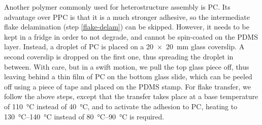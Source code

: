 Another polymer commonly used for heterostructure assembly is PC.
%
Its advantage over PPC is that it is a much stronger adhesive, so the intermediate flake delamination (step \ref{flake-delam}) can be skipped.
%
However, it needs to be kept in a fridge in order to not degrade, and cannot be spin-coated on the PDMS layer.
%
Instead, a droplet of PC is placed on a \SI{20x20}{\milli\meter} glass coverslip.
%
A second coverslip is dropped on the first one, thus spreading the droplet in between.
%
With care, but in a swift motion, we pull the top glass piece off, thus leaving behind a thin film of PC on the bottom glass slide, which can be peeled off using a piece of tape and placed on the PDMS stamp.
%
For flake transfer, we follow the above steps, except that the transfer takes place at a base temperature of \SI{110}{\celsius} instead of \SI{40}{\celsius}, and to activate the adhesion to PC, heating to \SIrange{130}{140}{\celsius} instead of \SIrange{80}{90}{\celsius} is required.


